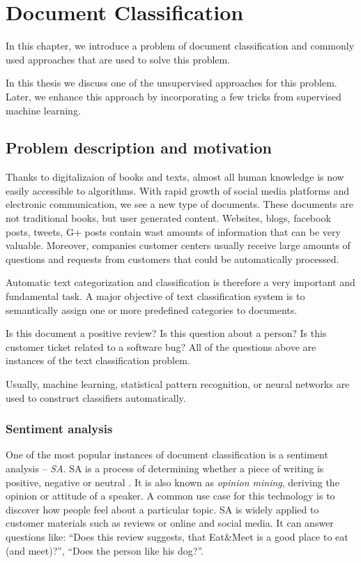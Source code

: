 \chapter{Document Classification}

    In this chapter, we introduce a problem of document classification and commonly used approaches that are used to solve this problem.
    
    In this thesis we discuss one of the unsupervised approaches for this problem.
    Later, we enhance this approach by incorporating a few tricks from supervised machine learning.

\section{Problem description and motivation} \label{sec:problem}

    Thanks to digitalizaion of books and texts, almost all human knowledge is now easily accessible to algorithms. 
    With rapid growth of social media platforms and electronic communication, we see a new type of documents.
    These documents are not traditional books, but user generated content.
    Websites, blogs, facebook posts, tweets, G+ posts contain wast amounts of information that can be very valuable.
    Moreover, companies customer centers usually receive large amounts of questions and requests from customers that could be automatically processed.
    
    Automatic text categorization and classification is therefore a very important and fundamental task. 
    A major objective of text classification system is to semantically assign one or more predefined categories to documents.
    
    Is this document a positive review? 
    Is this question about a person?
    Is this customer ticket related to a software bug?
    All of the questions above are instances of the text classification problem.
    
    Usually, machine learning, statistical pattern recognition, or neural networks are used to construct classifiers automatically.

    \subsection{Sentiment analysis}
    
    One of the most popular instances of document classification is a sentiment analysis -- \emph{SA}.
    SA is a process of determining whether a piece of writing is positive, negative or neutral \cite{jurafsky2000speech}.
    It is also known as \emph{opinion mining}, deriving the opinion or attitude of a speaker. 
    A common use case for this technology is to discover how people feel about a particular topic.
    SA is widely applied to customer materials such as reviews or online and social media.
    It can answer questions like: ``Does this review suggests, that Eat\&Meet is a good place to eat (and meet)?'', ``Does the person like his dog?''.
    
